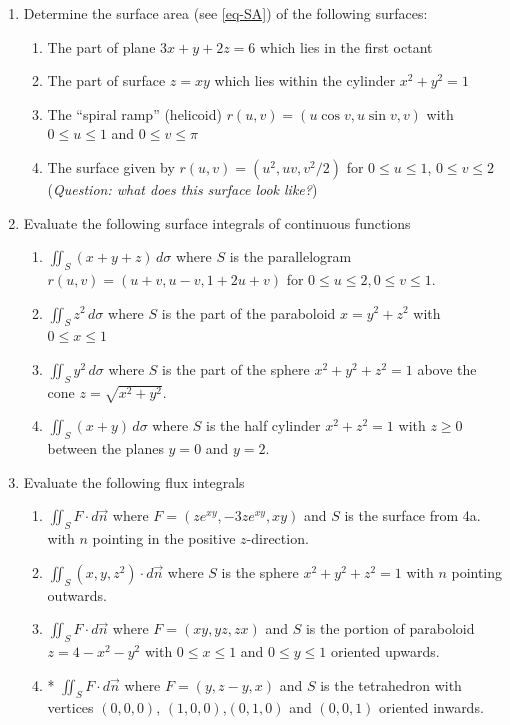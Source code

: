 \documentclass[12pt]{article}
\numberwithin{equation}{subsection}
\numberwithin{figure}{subsection}
\theoremstyle{note}
\begin{document}
{\begin{enumerate}[label=\arabic*.]
\item Determine the surface area (see \eqref{eq-SA}) of the following surfaces:
	
\begin{enumerate}
	\item The part of plane $3x+y+2z=6$ which lies in the first octant
	\item The part of surface $z=xy$ which lies within the cylinder $x^2+y^2=1$
	\item The ``spiral ramp'' (helicoid) $r(u,v)=(u\cos v, u\sin v, v)$ with $0\leq u\leq 1$ and $0\leq v\leq \pi$
	\item The surface given by $r(u,v)=(u^2, uv, v^2/2)$ for $0\leq u \leq 1$, $0\leq v\leq 2$ (\textit{Question: what does this surface look like?})
\end{enumerate}

\item Evaluate the following surface integrals of continuous functions

\begin{enumerate}
	\item $\displaystyle \iint_{S} (x+y+z)\,d\sigma$ where $S$ is the parallelogram $r(u,v)=(u+v, u-v, 1+2u+v)$ for $0\leq u\leq 2, 0\leq v\leq 1$.
	\item $\displaystyle \iint_{S} z^2 \,d\sigma$ where $S$ is the part of the paraboloid $x=y^2+z^2$ with $0\leq x\leq 1$
	\item $\displaystyle \iint_{S} y^2\,d\sigma$ where $S$ is the part of the sphere $x^2+y^2+z^2=1$ above the cone $z=\sqrt{x^2+y^2}$.
	\item $\displaystyle \iint_{S} (x+y)\,d\sigma$ where $S$ is the half cylinder $x^2+z^2=1$ with $z\geq 0$ between the planes $y=0$ and $y=2$. 
\end{enumerate}

\item Evaluate the following flux integrals 
\begin{enumerate}
	\item $\displaystyle \iint_{S} F\cdot d\vec{n}$ where $F=(ze^{xy}, -3ze^{xy}, xy)$ and $S$ is the surface from 4a. with $n$ pointing in the positive $z$-direction. 
	\item $\displaystyle \iint_{S} (x,y,z^2)\cdot d\vec{n}$ where $S$ is the sphere $x^2+y^2+z^2=1$ with $n$ pointing outwards.
	\item $\displaystyle \iint_{S} F\cdot d\vec{n}$ where $F=(xy, yz, zx)$ and $S$ is the portion of paraboloid $z=4-x^2-y^2$ with $0\leq x\leq 1$ and $0\leq y\leq 1$ oriented upwards.
	\item* $\displaystyle \iint_{S} F\cdot d\vec{n}$ where $F=(y,z-y,x)$ and $S$ is the tetrahedron with vertices $(0,0,0)$, $(1,0,0)$,$(0,1,0)$ and $(0,0,1)$ oriented inwards.
\end{enumerate}


\end{enumerate}}
\end{document}
